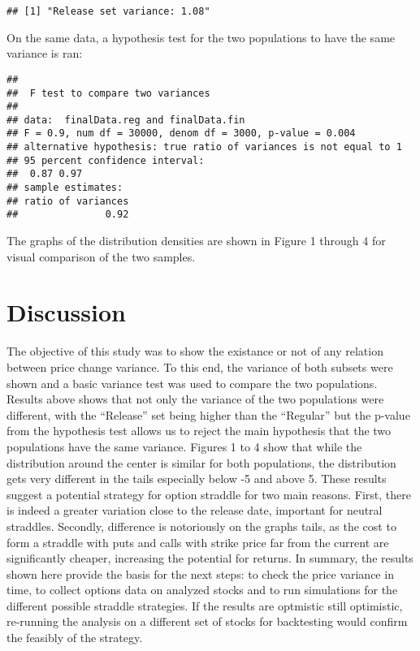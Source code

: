 \documentclass[english,man]{apa6}
\begin{document}
\begin{verbatim}
## [1] "Release set variance: 1.08"
\end{verbatim}

On the same data, a hypothesis test for the two populations to have the
same variance is ran:

\begin{verbatim}
## 
##  F test to compare two variances
## 
## data:  finalData.reg and finalData.fin
## F = 0.9, num df = 30000, denom df = 3000, p-value = 0.004
## alternative hypothesis: true ratio of variances is not equal to 1
## 95 percent confidence interval:
##  0.87 0.97
## sample estimates:
## ratio of variances 
##               0.92
\end{verbatim}

The graphs of the distribution densities are shown in Figure 1 through 4
for visual comparison of the two samples.

\section{Discussion}\label{discussion}

The objective of this study was to show the existance or not of any
relation between price change variance. To this end, the variance of
both subsets were shown and a basic variance test was used to compare
the two populations. Results above shows that not only the variance of
the two populations were different, with the \enquote{Release} set being
higher than the \enquote{Regular} but the p-value from the hypothesis
test allows us to reject the main hypothesis that the two populations
have the same variance. Figures 1 to 4 show that while the distribution
around the center is similar for both populations, the distribution gets
very different in the tails especially below -5 and above 5. These
results suggest a potential strategy for option straddle for two main
reasons. First, there is indeed a greater variation close to the release
date, important for neutral straddles. Secondly, difference is
notoriously on the graphs tails, as the cost to form a straddle with
puts and calls with strike price far from the current are significantly
cheaper, increasing the potential for returns. In summary, the results
shown here provide the basis for the next steps: to check the price
variance in time, to collect options data on analyzed stocks and to run
simulations for the different possible straddle strategies. If the
results are optmistic still optimistic, re-running the analysis on a
different set of stocks for backtesting would confirm the feasibly of
the strategy.
\end{document}
